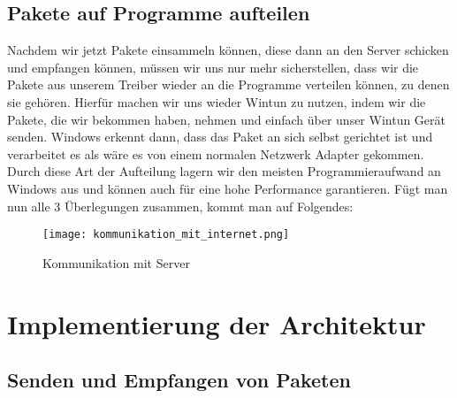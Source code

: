 \subsection{Pakete auf Programme aufteilen}
Nachdem wir jetzt Pakete einsammeln können, diese dann an den Server schicken und empfangen können, müssen wir uns nur mehr sicherstellen, dass wir die Pakete aus unserem Treiber wieder an die Programme verteilen können, zu denen sie gehören. 
\newline
\newline
Hierfür machen wir uns wieder Wintun zu nutzen, indem wir die Pakete, die wir bekommen haben, nehmen und einfach über unser Wintun Gerät senden. Windows erkennt dann, dass das Paket an sich selbst gerichtet ist und verarbeitet es als wäre es von einem normalen Netzwerk Adapter gekommen. Durch diese Art der Aufteilung lagern wir den meisten Programmieraufwand an Windows aus und können auch für eine hohe Performance garantieren.
\newpage
Fügt man nun alle 3 Überlegungen zusammen, kommt man auf Folgendes:
\begin{figure}[H]
    \centering
    \texttt{[image: kommunikation\_mit\_internet.png]}
    \caption[Kommunikation mit Server]{Kommunikation mit Server } 
\end{figure}
\newpage
\section{Implementierung der Architektur}
\subsection{Senden und Empfangen von Paketen}
